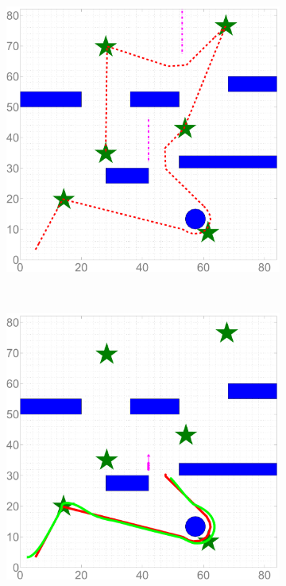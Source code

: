 \documentclass[letterpaper, 10 pt, conference]{ieeeconf}
\begin{document}
	\begin{figure}
		\centering
		\begin{subfigure}{0.2\textwidth}
			\includegraphics[width=\textwidth]{figures/ref_traj_end}
			\caption{}
			\label{fig:ref_traj_h}
		\end{subfigure}
		~
		\begin{subfigure}{0.2\textwidth}
			\includegraphics[width=\textwidth]{figures/sim_traj_obs1}

\end{subfigure}
\end{figure}
\end{document}
